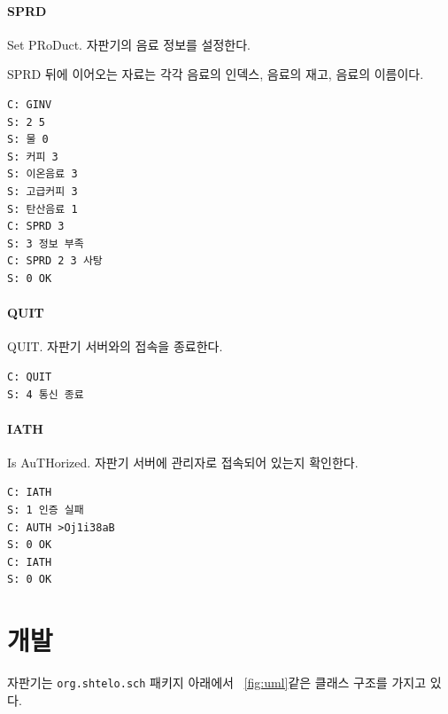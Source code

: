 \documentclass{oblivoir}
\newcommand{\figref}[1]{\figurename~\ref{#1}}
\begin{document}
    \paragraph{SPRD}
    Set PRoDuct.
    자판기의 음료 정보를 설정한다.

    SPRD 뒤에 이어오는 자료는 각각 음료의 인덱스,
    음료의 재고, 음료의 이름이다.

    \begin{verbatim}
C: GINV
S: 2 5
S: 물 0
S: 커피 3
S: 이온음료 3
S: 고급커피 3
S: 탄산음료 1
C: SPRD 3
S: 3 정보 부족
C: SPRD 2 3 사탕
S: 0 OK
    \end{verbatim}

    \paragraph{QUIT}
    QUIT. 자판기 서버와의 접속을 종료한다.

    \begin{verbatim}
C: QUIT
S: 4 통신 종료
    \end{verbatim}

    \paragraph{IATH}
    Is AuTHorized.
    자판기 서버에 관리자로 접속되어 있는지 확인한다.

    \begin{verbatim}
C: IATH
S: 1 인증 실패
C: AUTH >Oj1i38aB
S: 0 OK
C: IATH
S: 0 OK
    \end{verbatim}

    \section{개발}

    자판기는 \texttt{org.shtelo.sch} 패키지 아래에서 \figref{fig:uml}\과 같은 클래스 구조를 가지고 있다.
\end{document}
